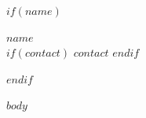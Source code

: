 \documentclass[11pt,letterpaper]{article}
\begin{document}
$if(name)$
\begin{center}
  {\LARGE \textbf{$name$}} \\[4pt]
  $if(contact)$
  $contact$
  $endif$
\end{center}
\vspace{8pt}
$endif$

$body$
\end{document}
